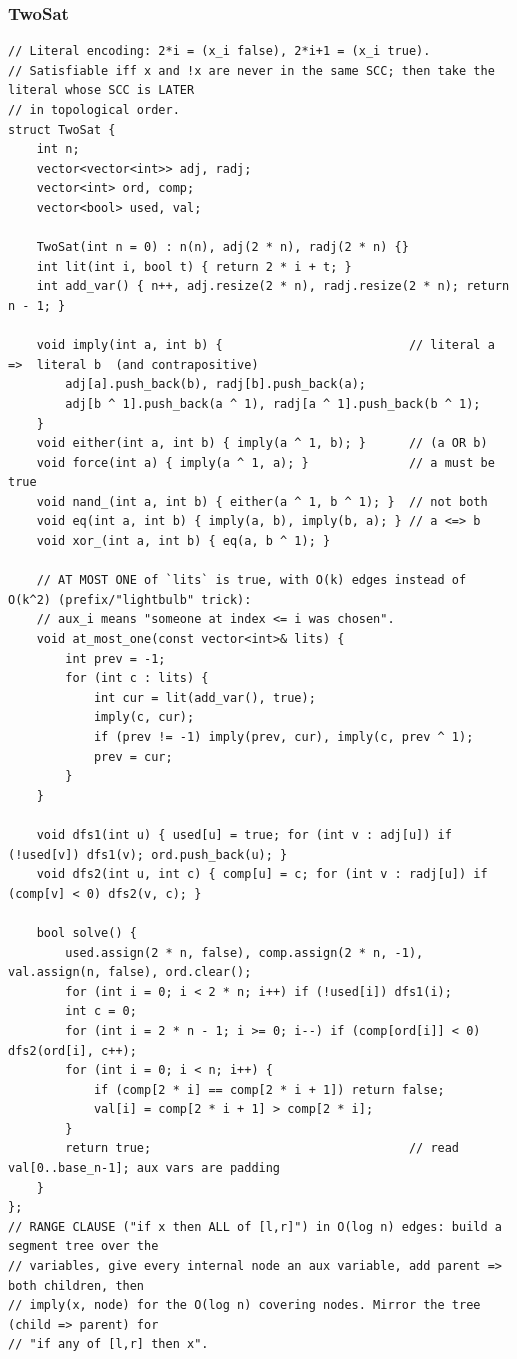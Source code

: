 \documentclass[9pt,a4paper,twocolumn]{extarticle}
\begin{document}
\subsubsection{TwoSat}
\nopagebreak
\begin{lstlisting}
// Literal encoding: 2*i = (x_i false), 2*i+1 = (x_i true).
// Satisfiable iff x and !x are never in the same SCC; then take the literal whose SCC is LATER
// in topological order.
struct TwoSat {
    int n;
    vector<vector<int>> adj, radj;
    vector<int> ord, comp;
    vector<bool> used, val;

    TwoSat(int n = 0) : n(n), adj(2 * n), radj(2 * n) {}
    int lit(int i, bool t) { return 2 * i + t; }
    int add_var() { n++, adj.resize(2 * n), radj.resize(2 * n); return n - 1; }

    void imply(int a, int b) {                          // literal a  =>  literal b  (and contrapositive)
        adj[a].push_back(b), radj[b].push_back(a);
        adj[b ^ 1].push_back(a ^ 1), radj[a ^ 1].push_back(b ^ 1);
    }
    void either(int a, int b) { imply(a ^ 1, b); }      // (a OR b)
    void force(int a) { imply(a ^ 1, a); }              // a must be true
    void nand_(int a, int b) { either(a ^ 1, b ^ 1); }  // not both
    void eq(int a, int b) { imply(a, b), imply(b, a); } // a <=> b
    void xor_(int a, int b) { eq(a, b ^ 1); }

    // AT MOST ONE of `lits` is true, with O(k) edges instead of O(k^2) (prefix/"lightbulb" trick):
    // aux_i means "someone at index <= i was chosen".
    void at_most_one(const vector<int>& lits) {
        int prev = -1;
        for (int c : lits) {
            int cur = lit(add_var(), true);
            imply(c, cur);
            if (prev != -1) imply(prev, cur), imply(c, prev ^ 1);
            prev = cur;
        }
    }

    void dfs1(int u) { used[u] = true; for (int v : adj[u]) if (!used[v]) dfs1(v); ord.push_back(u); }
    void dfs2(int u, int c) { comp[u] = c; for (int v : radj[u]) if (comp[v] < 0) dfs2(v, c); }

    bool solve() {
        used.assign(2 * n, false), comp.assign(2 * n, -1), val.assign(n, false), ord.clear();
        for (int i = 0; i < 2 * n; i++) if (!used[i]) dfs1(i);
        int c = 0;
        for (int i = 2 * n - 1; i >= 0; i--) if (comp[ord[i]] < 0) dfs2(ord[i], c++);
        for (int i = 0; i < n; i++) {
            if (comp[2 * i] == comp[2 * i + 1]) return false;
            val[i] = comp[2 * i + 1] > comp[2 * i];
        }
        return true;                                    // read val[0..base_n-1]; aux vars are padding
    }
};
// RANGE CLAUSE ("if x then ALL of [l,r]") in O(log n) edges: build a segment tree over the
// variables, give every internal node an aux variable, add parent => both children, then
// imply(x, node) for the O(log n) covering nodes. Mirror the tree (child => parent) for
// "if any of [l,r] then x".
\end{lstlisting}
\end{document}
